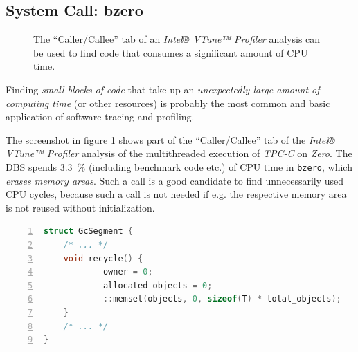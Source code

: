 \subsection{System Call: bzero} \label{subsec:looking_glass_bzero}

\begin{@empty}
    \setlength{\fboxsep}{0pt}%
    \setlength{\fboxrule}{1pt}%
    
    \begin{figure}[h!]
        \centering
        \vspace{.75em}
        \caption[The VTune™ Profiler uncovers unnecessary memory erasure]{The ``Caller/Callee'' tab of an \textit{Intel® VTune™ Profiler} analysis can be used to find code that consumes a significant amount of CPU time.}
        \label{fig:bzero}
    \end{figure}
\end{@empty}

    Finding \emph{small blocks of code} that take up an \emph{unexpectedly large amount of computing time} (or other resources) is probably the most common and basic application of software tracing and profiling.

    The screenshot in figure \ref{fig:bzero} shows part of the ``Caller/Callee'' tab of the \textit{Intel® VTune™ Profiler} analysis of the multithreaded execution of \textit{TPC-C} on \textit{Zero}. The DBS spends \SI{3.3}{\percent} (including benchmark code etc.) of CPU time in \lstinline|bzero|, which \emph{erases memory areas}. Such a call is a good candidate to find unnecessarily used CPU cycles, because such a call is not needed if e.g. the respective memory area is not reused without initialization.

\begin{@empty}
    \begin{code}[h!]
        \begin{lstlisting}[numbers = left, language = C++]
struct GcSegment {
    /* ... */
    void recycle() {
            owner = 0;
            allocated_objects = 0;
            ::memset(objects, 0, sizeof(T) * total_objects);
    }
    /* ... */
}
        \end{lstlisting}
        \caption[Source code with unnecessary memory erasure]{The member function \lstinline|GcSegment::recycle| does unnecessarily erase a memory area.}
        \label{lst:bzero}
    \end{code}
\end{@empty}

